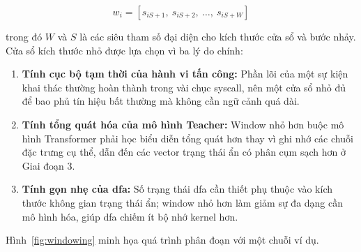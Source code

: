 \documentclass[../main.tex]{subfiles}
\begin{document}
\begin{equation}
  \label{eq:window}
  w_i = [s_{iS+1},\ s_{iS+2},\ \ldots,\ s_{iS+W}]
\end{equation}

trong đó $W$ và $S$ là các siêu tham số đại diện cho kích thước cửa
sổ và bước nhảy. Cửa sổ
kích thước nhỏ được lựa chọn vì ba lý do chính:

\begin{enumerate}
  \item \textbf{Tính cục bộ tạm thời của hành vi tấn công:} Phần lõi
    của một sự kiện
    khai thác thường hoàn thành trong vài chục \gls{syscall}, nên một cửa
    sổ nhỏ đủ để bao
    phủ tín hiệu bất thường mà không cần ngữ cảnh quá dài.
  \item \textbf{Tính tổng quát hóa của mô hình Teacher:} Window nhỏ
    hơn buộc mô hình
    Transformer phải học biểu diễn tổng quát hơn thay vì ghi nhớ các
    chuỗi đặc trưng
    cụ thể, dẫn đến các vector trạng thái ẩn có phân cụm sạch hơn ở Giai đoạn 3.
  \item \textbf{Tính gọn nhẹ của \gls{dfa}:} Số trạng thái \gls{dfa}
    cần thiết phụ thuộc vào
    kích thước không gian trạng thái ẩn; window nhỏ hơn làm giảm sự
    đa dạng cần mô
    hình hóa, giúp \gls{dfa} chiếm ít bộ nhớ kernel hơn.
\end{enumerate}

Hình~\ref{fig:windowing} minh họa quá trình phân đoạn với một chuỗi ví dụ.
\end{document}
